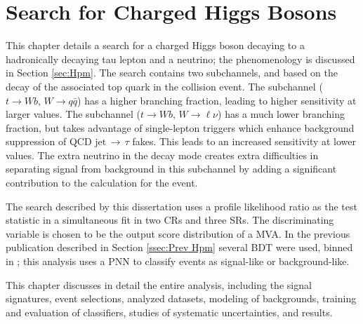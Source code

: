\chapter{Search for Charged Higgs Bosons}\label{chap:hpana}
	This chapter details a search for a charged Higgs boson decaying to a hadronically decaying tau lepton and a neutrino; the phenomenology is discussed in Section \ref{sec:Hpm}. The search contains two subchannels, \taujets and \taulep based on the decay of the associated top quark in the collision event. The \taujets subchannel ($t\to Wb, \, W \to q\bar{q}$)  has a higher branching fraction, leading to higher sensitivity at larger \mHpm values. The \taulep subchannel ($t\to Wb, \, W \to \ell \nu$)  has a much lower branching fraction, but takes advantage of single-lepton triggers which enhance background suppression of \acrshort{QCD} $\mathrm{jet} \, \to \, \tau$ fakes. This leads to an increased sensitivity at lower \mHpm values. The extra neutrino in the \taulep decay mode creates extra difficulties in separating signal from background in this subchannel by adding a significant contribution to the \Etm calculation for the event. 

	The search described by this dissertation uses a profile likelihood ratio as the test statistic in a simultaneous fit in two \glspl{CR} and three \glspl{SR}. The discriminating variable is chosen to be the output score distribution of a \gls{MVA}. In the previous publication described in Section \ref{ssec:Prev Hpm} several \gls{BDT} were used, binned in \mHpm; this analysis uses a \gls{PNN} to classify events as signal-like or background-like.

	This chapter discusses in detail the entire analysis, including the signal signatures, event selections, analyzed datasets, modeling of backgrounds, training and evaluation of classifiers, studies of systematic uncertainties, and results.

